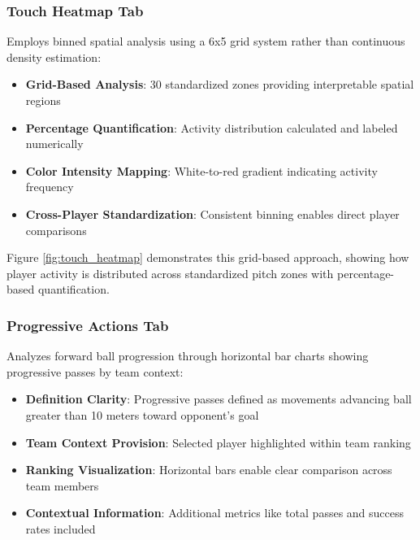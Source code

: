 \documentclass[12pt,a4paper]{article}
\begin{document}
\subsubsection{Touch Heatmap Tab}
\label{sec:touch_heatmap}
Employs binned spatial analysis using a 6x5 grid system rather than continuous density estimation:
\begin{itemize}
    \item \textbf{Grid-Based Analysis}: 30 standardized zones providing interpretable spatial regions
    \item \textbf{Percentage Quantification}: Activity distribution calculated and labeled numerically
    \item \textbf{Color Intensity Mapping}: White-to-red gradient indicating activity frequency
    \item \textbf{Cross-Player Standardization}: Consistent binning enables direct player comparisons
\end{itemize}

Figure \ref{fig:touch_heatmap} demonstrates this grid-based approach, showing how player activity is distributed across standardized pitch zones with percentage-based quantification.


\subsubsection{Progressive Actions Tab}
Analyzes forward ball progression through horizontal bar charts showing progressive passes by team context:
\begin{itemize}
    \item \textbf{Definition Clarity}: Progressive passes defined as movements advancing ball greater than 10 meters toward opponent's goal
    \item \textbf{Team Context Provision}: Selected player highlighted within team ranking
    \item \textbf{Ranking Visualization}: Horizontal bars enable clear comparison across team members
    \item \textbf{Contextual Information}: Additional metrics like total passes and success rates included
\end{itemize}
\end{document}
